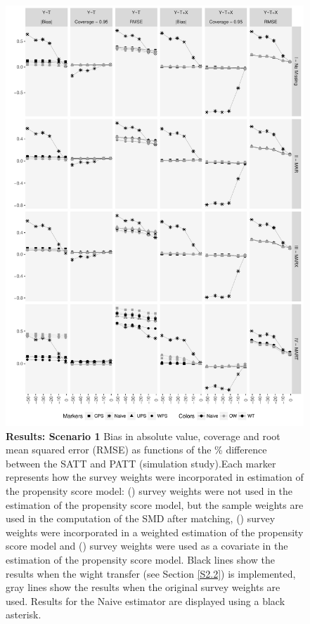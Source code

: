 \documentclass[oupdraft]{bio}
\newcommand{\mysquare}[1]{\tikz{\node[draw=#1,fill=#1,rectangle,minimum
width=0.18cm,minimum height=0.18cm,inner sep=0pt] at (0,0) {};}}
\newcommand{\mycircle}[1]{\tikz{\node[draw=#1,fill=#1,circle,minimum
width=0.2cm,minimum height=0.2cm,inner sep=0pt] at (0,0) {};}}
\newcommand{\mytriangle}[1]{\tikz{\node[draw=#1,fill=#1,isosceles
triangle,isosceles triangle stretches,shape border rotate=90,minimum
width=0.2cm,minimum height=0.2cm,inner sep=0pt] at (0,0) {};}}
\begin{document}
\begin{figure}[t]
\centering\includegraphics[scale=0.63]{Scenario1_v2.pdf}
\caption{{\small{}\textbf{Results: Scenario 1} Bias in absolute value, coverage and root mean squared error (RMSE) as functions
of the \% difference between the SATT and PATT (simulation study).Each marker represents how the survey weights were incorporated in estimation of the propensity score model: (\mytriangle{black}) survey weights were not used in the estimation of the propensity score model, but the sample weights are used in the computation of the SMD after matching, (\mycircle{black}) survey weights were incorporated in a weighted estimation of the propensity score model and (\mysquare{black})  survey weights were used as a covariate in the estimation of the propensity score model. Black lines  show the results when the wight transfer (see Section \ref{S2.2}) is implemented, gray lines show the results when the original survey weights are used. Results for the Naive estimator are displayed using a black asterisk.}}
\label{Scenario1} 
\end{figure}
\end{document}
